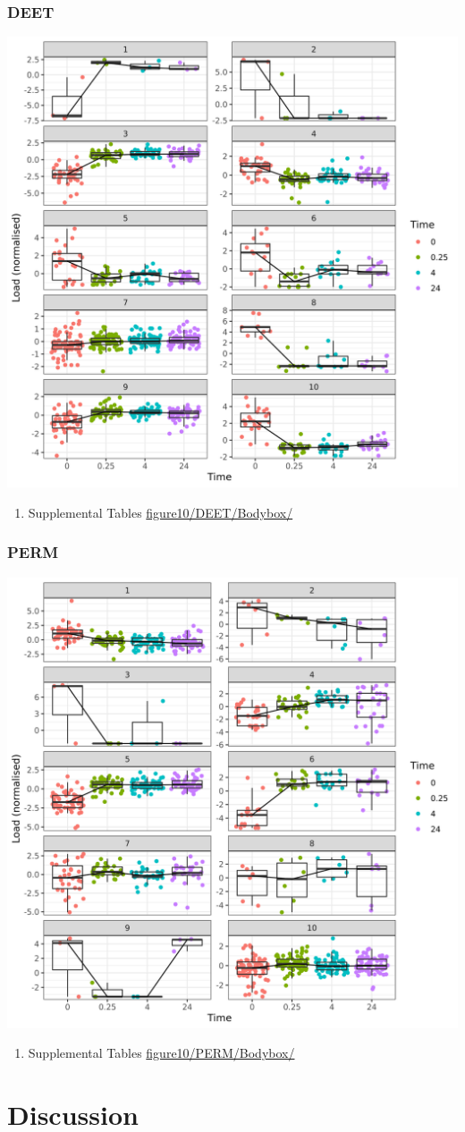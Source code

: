 \documentclass[11pt]{article}
\begin{document}
\subsubsection{DEET}
\label{sec:org154e56e}
\begin{center}
\includegraphics[width=.9\linewidth]{figure10/DEET/Bodybox.png}
\end{center}
\begin{enumerate}
\item Supplemental Tables
\label{sec:orge4a5927}
\url{figure10/DEET/Bodybox/}
\end{enumerate}
\subsubsection{PERM}
\label{sec:org006767e}
\begin{center}
\includegraphics[width=.9\linewidth]{figure10/PERM/Bodybox.png}
\end{center}
\begin{enumerate}
\item Supplemental Tables
\label{sec:orgac21821}
\url{figure10/PERM/Bodybox/}
\end{enumerate}

\section{Discussion}
\label{sec:org9142f67}
\end{document}
